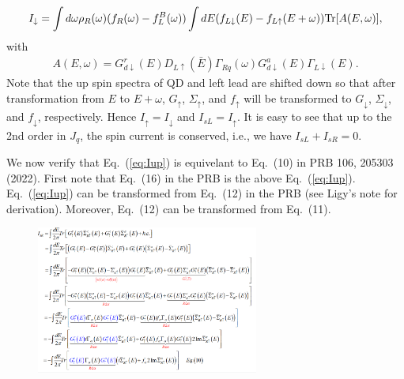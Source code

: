 \documentclass[aps,prb,superscriptaddress]{revtex4-2}
\begin{document}
\begin{equation}
I_{\downarrow} =\int d\omega \rho_R(\omega) (f_R(\omega)-f^B_L(\omega))\int dE (f_{L\downarrow}(E)-f_{L\uparrow}(E+\omega)) {\rm Tr}[A(E,\omega)] ,
\end{equation}
with
\begin{eqnarray}
A(E,\omega)= G^r_{d\downarrow}(E) D_{L\uparrow}(\bar E) \Gamma_{Rq}(\omega) G^a_{d\downarrow}(E)\Gamma_{L\downarrow}(E).
\end{eqnarray}
Note that the up spin spectra of QD and left lead are shifted down so that after transformation from $E$ to $E+\omega$, $G_\uparrow$, $\Sigma_\uparrow$, and $f_\uparrow$ will be transformed to $G_\downarrow$, $\Sigma_\downarrow$, and $f_\downarrow$, respectively. Hence $I_\uparrow = I_\downarrow$ and $I_{sL} = I_\uparrow$. It is easy to see that up to the 2nd order in $J_q$, the spin current is conserved, i.e., we have $I_{sL} + I_{sR}=0$.

We now verify that Eq.~(\ref{eq:Iup}) is equivelant to Eq.~(10) in PRB 106, 205303 (2022). First note that Eq.~(16) in the PRB is the above Eq.~(\ref{eq:Iup}). Eq.~(\ref{eq:Iup}) can be transformed from Eq.~(12) in the PRB (see Ligy's note for derivation). Moreover, Eq.~(12) can be transformed from Eq.~(11).
\begin{figure}[htp!]
\centering
\includegraphics[width=0.65\textwidth, height=0.5\textwidth]{figures/eq1.png}
\end{figure}
\end{document}
